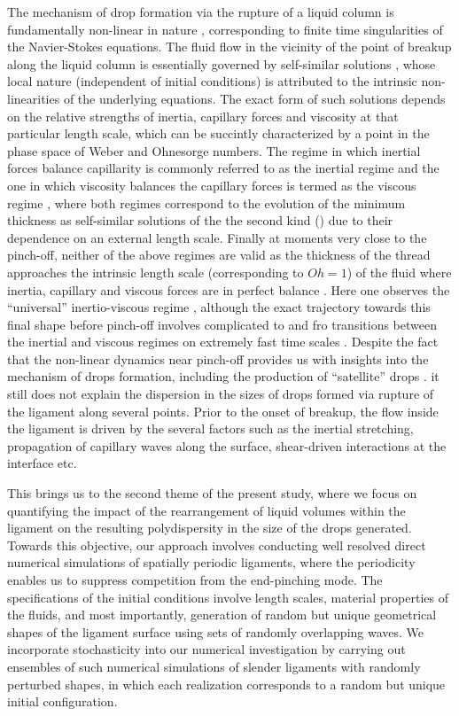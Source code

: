 The mechanism of drop formation via the rupture of a liquid column is 
fundamentally non-linear in nature \cite{eggers2008physics,eggers1995theory}, 
corresponding to finite time singularities of the Navier-Stokes equations.  
The fluid flow in the vicinity of the point of breakup along the liquid column 
is essentially governed by self-similar solutions \cite{eggers1997nonlinear}, whose local nature 
(independent of initial conditions) is attributed to the intrinsic non-linearities of the underlying equations.  
The exact form of such solutions depends on the relative strengths of inertia, 
capillary forces and viscosity at that particular length scale, which can be 
succintly characterized by a point in the phase space of Weber and Ohnesorge numbers.  
The regime in which inertial forces balance capillarity is commonly referred to as
the inertial regime \cite{inertial_1,inertial_2} and the one in which viscosity balances
the capillary forces is termed as the viscous regime \cite{viscous_1,viscous_2}, 
where both regimes correspond to the evolution of the minimum thickness as self-similar solutions 
of the the second kind (\cite{barenblatt}) due to their dependence on an external length scale.
Finally at moments very close to the pinch-off, neither of the above regimes 
are valid as the thickness of the thread approaches the intrinsic length scale (corresponding to $Oh = 1$) 
of the fluid where inertia, capillary and viscous forces are in perfect balance \cite{length_1}.
Here one observes the ``universal'' inertio-viscous regime \cite{length_2}, although the exact 
trajectory towards this final shape before pinch-off involves complicated to and fro transitions 
between the inertial and viscous regimes on extremely fast time scales \cite{plethora}. 
Despite the fact that the non-linear dynamics near pinch-off provides us with insights into
the mechanism of drops formation, including the production of ``satellite'' drops \cite{sat_1, satellite_1, satellite_2}.  
it still does not explain the dispersion in the sizes of drops formed via rupture of the ligament along several points. 
Prior to the onset of breakup, the flow inside the ligament is driven by the several factors such as  
the inertial stretching, propagation of capillary waves along the surface, shear-driven interactions at the interface etc.   

This brings us to the second theme of the present study, where we focus on quantifying the impact of the 
rearrangement of liquid volumes within the ligament on the resulting polydispersity in the size of the drops generated. 
Towards this objective, our approach involves conducting well resolved direct numerical simulations of 
spatially periodic ligaments, where the periodicity enables us to suppress competition from the end-pinching mode. 
The specifications of the initial conditions involve length scales, material properties of the fluids, and most importantly,
generation of random but unique geometrical shapes of the ligament surface using sets of randomly overlapping waves.
We incorporate stochasticity into our numerical investigation by carrying out ensembles of such numerical 
simulations of slender ligaments with randomly perturbed shapes, in which each realization corresponds 
to a random but unique initial configuration.

